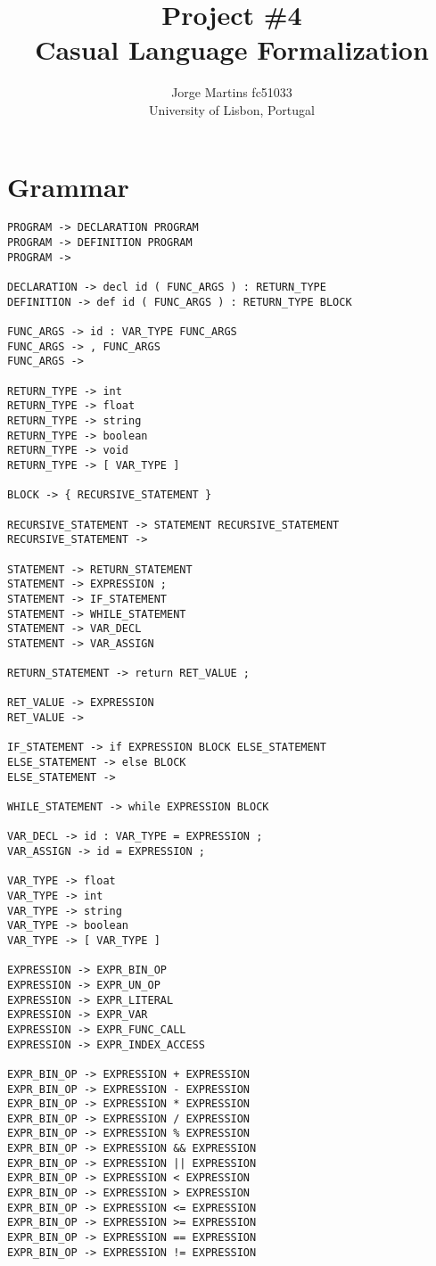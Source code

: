 \documentclass[11pt, a4paper]{article}
\author{Jorge Martins fc51033\\
University of Lisbon, Portugal}
\date{}
\title{Project \#4\\ Casual Language Formalization}
\begin{document}
\maketitle
\thispagestyle{empty}
\newpage
\section{Grammar}
\begin{lstlisting}
PROGRAM -> DECLARATION PROGRAM
PROGRAM -> DEFINITION PROGRAM
PROGRAM -> 

DECLARATION -> decl id ( FUNC_ARGS ) : RETURN_TYPE
DEFINITION -> def id ( FUNC_ARGS ) : RETURN_TYPE BLOCK

FUNC_ARGS -> id : VAR_TYPE FUNC_ARGS
FUNC_ARGS -> , FUNC_ARGS
FUNC_ARGS ->

RETURN_TYPE -> int
RETURN_TYPE -> float
RETURN_TYPE -> string
RETURN_TYPE -> boolean
RETURN_TYPE -> void
RETURN_TYPE -> [ VAR_TYPE ]

BLOCK -> { RECURSIVE_STATEMENT }

RECURSIVE_STATEMENT -> STATEMENT RECURSIVE_STATEMENT
RECURSIVE_STATEMENT ->

STATEMENT -> RETURN_STATEMENT
STATEMENT -> EXPRESSION ;
STATEMENT -> IF_STATEMENT
STATEMENT -> WHILE_STATEMENT
STATEMENT -> VAR_DECL
STATEMENT -> VAR_ASSIGN

RETURN_STATEMENT -> return RET_VALUE ;

RET_VALUE -> EXPRESSION
RET_VALUE ->

IF_STATEMENT -> if EXPRESSION BLOCK ELSE_STATEMENT
ELSE_STATEMENT -> else BLOCK
ELSE_STATEMENT ->

WHILE_STATEMENT -> while EXPRESSION BLOCK

VAR_DECL -> id : VAR_TYPE = EXPRESSION ;
VAR_ASSIGN -> id = EXPRESSION ; 

VAR_TYPE -> float
VAR_TYPE -> int
VAR_TYPE -> string
VAR_TYPE -> boolean
VAR_TYPE -> [ VAR_TYPE ]

EXPRESSION -> EXPR_BIN_OP
EXPRESSION -> EXPR_UN_OP
EXPRESSION -> EXPR_LITERAL
EXPRESSION -> EXPR_VAR
EXPRESSION -> EXPR_FUNC_CALL
EXPRESSION -> EXPR_INDEX_ACCESS

EXPR_BIN_OP -> EXPRESSION + EXPRESSION
EXPR_BIN_OP -> EXPRESSION - EXPRESSION
EXPR_BIN_OP -> EXPRESSION * EXPRESSION
EXPR_BIN_OP -> EXPRESSION / EXPRESSION
EXPR_BIN_OP -> EXPRESSION % EXPRESSION
EXPR_BIN_OP -> EXPRESSION && EXPRESSION
EXPR_BIN_OP -> EXPRESSION || EXPRESSION
EXPR_BIN_OP -> EXPRESSION < EXPRESSION
EXPR_BIN_OP -> EXPRESSION > EXPRESSION
EXPR_BIN_OP -> EXPRESSION <= EXPRESSION
EXPR_BIN_OP -> EXPRESSION >= EXPRESSION
EXPR_BIN_OP -> EXPRESSION == EXPRESSION
EXPR_BIN_OP -> EXPRESSION != EXPRESSION


\end{lstlisting}
\end{document}
